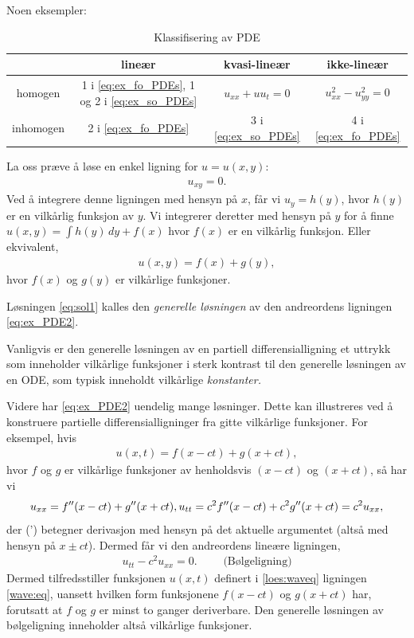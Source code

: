 Noen eksempler:
\begin{table}[ht]
\centering
\begin{tabular}{|c|c|c|c|}
\hline
       & lineær  & kvasi-lineær & ikke-lineær \\
\hline
homogen  &  1 i \eqref{eq:ex_fo_PDEs}, 1 og 2 i \eqref{eq:ex_so_PDEs} & $u_{xx}+uu_t =0$ & $u_{xx}^2-u_{yy}^2=0$\\
\hline
inhomogen  & 2 i \eqref{eq:ex_fo_PDEs} & 3 i \eqref{eq:ex_so_PDEs}  & 4 i \eqref{eq:ex_fo_PDEs}\\
\hline
\end{tabular}
\caption{Klassifisering av PDE}
\label{tab:example}
\end{table}

La oss præve å løse en enkel ligning for \( u = u(x, y) \):
\begin{align}\label{eq:ex_PDE2}
u_{xy} = 0. 
\end{align}
Ved å integrere denne ligningen med hensyn på \( x \), får vi $u_y = h(y)$, hvor \( h(y) \) er en vilkårlig funksjon av \( y \). Vi integrerer deretter med hensyn på \( y \) for å finne
$u(x, y) = \int h(y)\,dy + f(x)$ 
hvor \( f(x) \) er en vilkårlig funksjon. Eller ekvivalent,
\begin{align}\label{eq:sol1}
u(x, y) = f(x) + g(y),
\end{align}
hvor \( f(x) \) og \( g(y) \) er vilkårlige funksjoner.

\begin{defn}{}
Løsningen \eqref{eq:sol1} kalles den \emph{generelle løsningen} av den andreordens ligningen \eqref{eq:ex_PDE2}.
\end{defn}
Vanligvis er den generelle løsningen av en partiell differensialligning et uttrykk som inneholder vilkårlige funksjoner i sterk kontrast til den generelle løsningen av en ODE, som typisk inneholdt vilkårlige \textit{konstanter.}

Videre har \eqref{eq:ex_PDE2} uendelig mange løsninger. Dette kan illustreres ved å konstruere partielle differensialligninger fra gitte vilkårlige funksjoner. For eksempel, hvis
\begin{align}\label{loes:waveq}
u(x, t) = f(x - ct) + g(x + ct),
\end{align}
hvor \( f \) og \( g \) er vilkårlige funksjoner av henholdsvis \( (x - ct) \) og \( (x + ct) \), så har vi
\[
u_{xx} = f''(x - ct) + g''(x + ct), \\
u_{tt} = c^2 f''(x - ct) + c^2 g''(x + ct) = c^2 u_{xx},
\]
der (') betegner derivasjon med hensyn på det aktuelle argumentet (altså med hensyn på $x\pm ct$). Dermed får vi den andreordens lineære ligningen, 
\begin{align}\label{wave:eq}
u_{tt} - c^2 u_{xx} = 0. \qquad\text{  (Bølgeligning)}
\end{align}
Dermed tilfredsstiller funksjonen \( u(x, t) \) definert i \eqref{loes:waveq} ligningen \eqref{wave:eq}, uansett hvilken form funksjonene \( f(x - ct) \) og \( g(x + ct) \) har, forutsatt at \( f \) og \( g \) er minst to ganger deriverbare. Den generelle løsningen av bølgeligning inneholder altså vilkårlige funksjoner.

